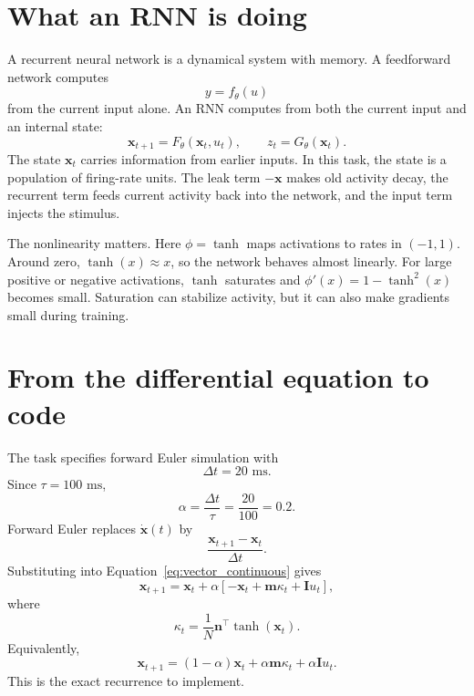 \documentclass[11pt]{article}
\newcommand{\vx}{\mathbf{x}}
\newcommand{\vm}{\mathbf{m}}
\newcommand{\vn}{\mathbf{n}}
\newcommand{\vI}{\mathbf{I}}
\newcommand{\dt}{\Delta t}
\begin{document}
\section{What an RNN is doing}

A recurrent neural network is a dynamical system with memory. A feedforward
network computes
\begin{equation}
  y = f_\theta(u)
\end{equation}
from the current input alone. An RNN computes from both the current input and an
internal state:
\begin{equation}
  \vx_{t+1} = F_\theta(\vx_t, u_t),
  \qquad
  z_t = G_\theta(\vx_t).
\end{equation}
The state $\vx_t$ carries information from earlier inputs. In this task, the
state is a population of firing-rate units. The leak term $-\vx$ makes old
activity decay, the recurrent term feeds current activity back into the network,
and the input term injects the stimulus.

The nonlinearity matters. Here $\phi = \tanh$ maps activations to rates in
$(-1,1)$. Around zero, $\tanh(x) \approx x$, so the network behaves almost
linearly. For large positive or negative activations, $\tanh$ saturates and
$\phi'(x) = 1 - \tanh^2(x)$ becomes small. Saturation can stabilize activity, but
it can also make gradients small during training.

\section{From the differential equation to code}

The task specifies forward Euler simulation with
\[
  \dt = 20\text{ ms}.
\]
Since $\tau = 100\text{ ms}$,
\[
  \alpha = \frac{\dt}{\tau} = \frac{20}{100} = 0.2.
\]
Forward Euler replaces $\dot{\vx}(t)$ by
\[
  \frac{\vx_{t+1} - \vx_t}{\dt}.
\]
Substituting into Equation~\ref{eq:vector_continuous} gives
\begin{equation}
  \vx_{t+1}
  =
  \vx_t
  +
  \alpha
  \left[
    -\vx_t
    +
    \vm\kappa_t
    +
    \vI u_t
  \right],
  \label{eq:euler_update}
\end{equation}
where
\begin{equation}
  \kappa_t = \frac{1}{N}\vn^\top\tanh(\vx_t).
\end{equation}
Equivalently,
\begin{equation}
  \vx_{t+1}
  =
  (1-\alpha)\vx_t
  +
  \alpha\vm\kappa_t
  +
  \alpha\vI u_t.
  \label{eq:euler_expanded}
\end{equation}
This is the exact recurrence to implement.
\end{document}
